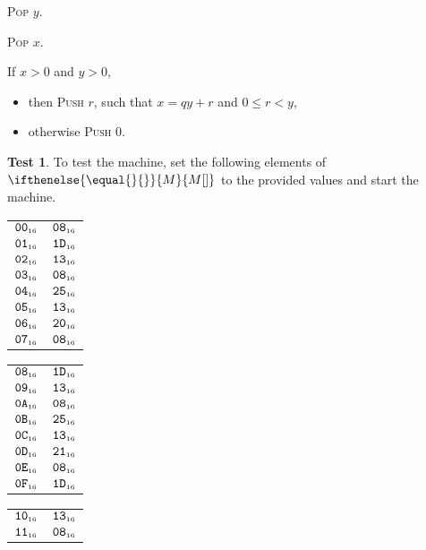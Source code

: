 \documentclass[a4paper,12pt]{article}
\makeatletter
\newcommand{\num}[1]{\texttt{#1}}
\newcommand{\hex}[1]{\num{#1}_{\textup{\tiny 16}}}
\newcommand{\MEM}[1]{\ifthenelse{\equal{#1}{}}{M}{M[#1]}}
\newcommand{\proc}[1]{\textsc{#1}}
\theoremstyle{definition}
\newtheorem{test}{Test}
\newenvironment{memtable}{%
  \begin{trivlist}
    \item
    }{%
    \end{trivlist}}
\newenvironment{memcolumn}{%
  \begin{tabular}{@{}ll@{}}
    \hline}
    {%
    \hline
  \end{tabular}}
\newcommand{\memspace}{\qquad}
\makeatother
\begin{document}
\begin{stepnumbers}[start=3]
\begin{description}
\begin{stepnumbers}
    \item \proc{Pop} $y$.
    \item \proc{Pop} $x$.
    \item If $x > 0$ and $y > 0$,
      \begin{itemize}[label=]
      \item then \proc{Push} $r$, such that $x = qy + r$ and $0 \leq r < y$,
      \item otherwise \proc{Push} 0.
      \end{itemize}
    \end{stepnumbers}
  \end{description}
\end{stepnumbers}

\begin{test}
  To test the machine, set the following elements of $\MEM{}$ to the provided values and start the machine.
  \begin{memtable}
    \begin{memcolumn}
      $\hex{00}$ & $\hex{08}$ \\
      $\hex{01}$ & $\hex{1D}$ \\
      $\hex{02}$ & $\hex{13}$ \\
      $\hex{03}$ & $\hex{08}$ \\
      $\hex{04}$ & $\hex{25}$ \\
      $\hex{05}$ & $\hex{13}$ \\
      $\hex{06}$ & $\hex{20}$ \\
      $\hex{07}$ & $\hex{08}$ \\
    \end{memcolumn}
    \memspace
    \begin{memcolumn}
      $\hex{08}$ & $\hex{1D}$ \\
      $\hex{09}$ & $\hex{13}$ \\
      $\hex{0A}$ & $\hex{08}$ \\
      $\hex{0B}$ & $\hex{25}$ \\
      $\hex{0C}$ & $\hex{13}$ \\
      $\hex{0D}$ & $\hex{21}$ \\
      $\hex{0E}$ & $\hex{08}$ \\
      $\hex{0F}$ & $\hex{1D}$ \\
    \end{memcolumn}
    \memspace
    \begin{memcolumn}
      $\hex{10}$ & $\hex{13}$ \\
      $\hex{11}$ & $\hex{08}$ \\

\end{memcolumn}
\end{memtable}
\end{test}
\end{document}
